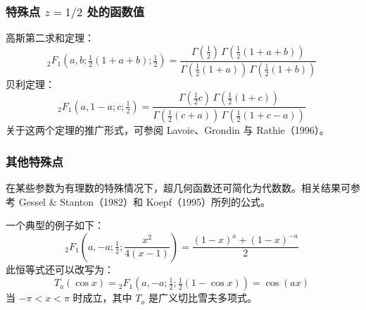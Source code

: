 \subsubsection{特殊点 $z = 1/2$ 处的函数值}
高斯第二求和定理：
$$
{}_2F_1\left(a, b; \tfrac{1}{2}(1 + a + b); \tfrac{1}{2} \right)
=
\frac{
\Gamma\left(\tfrac{1}{2}\right)\, \Gamma\left(\tfrac{1}{2}(1 + a + b)\right)
}{
\Gamma\left(\tfrac{1}{2}(1 + a)\right)\, \Gamma\left(\tfrac{1}{2}(1 + b)\right)}~
$$
贝利定理：
$$
{}_2F_1\left(a, 1 - a; c; \tfrac{1}{2} \right)
=
\frac{
\Gamma\left(\tfrac{1}{2}c\right)\, \Gamma\left(\tfrac{1}{2}(1 + c)\right)
}{
\Gamma\left(\tfrac{1}{2}(c + a)\right)\, \Gamma\left(\tfrac{1}{2}(1 + c - a)\right)}~
$$
关于这两个定理的推广形式，可参阅 Lavoie、Grondin 与 Rathie（1996）。
\subsubsection{其他特殊点}
在某些参数为有理数的特殊情况下，超几何函数还可简化为代数数。相关结果可参考 Gessel & Stanton（1982）和 Koepf（1995）所列的公式。

一个典型的例子如下：
$$
{}_2F_1\left(a, -a; \tfrac{1}{2}; \frac{x^2}{4(x - 1)}\right)
=
\frac{(1 - x)^a + (1 - x)^{-a}}{2}~
$$
此恒等式还可以改写为：
$$
T_a(\cos x)
=
{}_2F_1\left(a, -a; \tfrac{1}{2}; \tfrac{1}{2}(1 - \cos x)\right)
=
\cos(ax)~
$$
当 $-\pi < x < \pi$ 时成立，其中 $T_a$ 是广义切比雪夫多项式。

